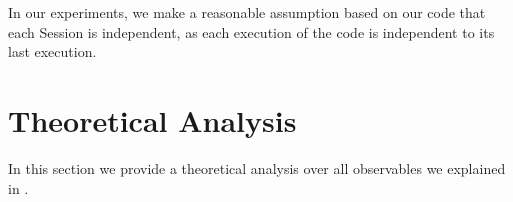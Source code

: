 In our experiments, we make a reasonable assumption based on our code that each Session is independent, as each execution of the code is independent to its last execution.

\section{Theoretical Analysis}

In this section we provide a theoretical analysis over all observables we explained in .



